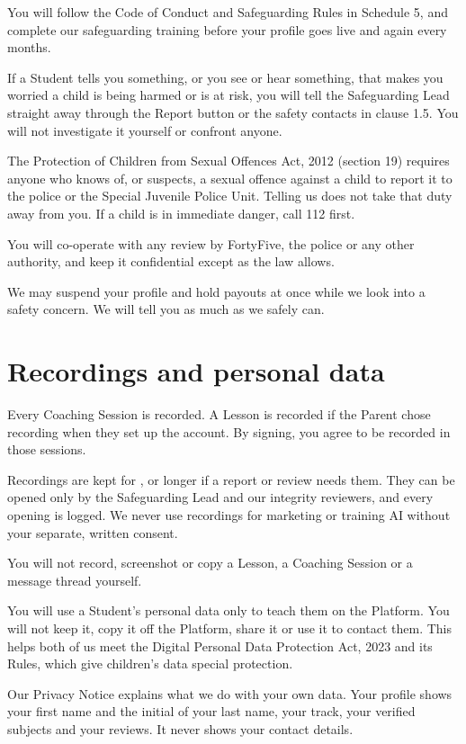 \documentclass[11pt]{article}
\begin{document}
\begin{clauses}
  \item You will follow the Code of Conduct and Safeguarding Rules in Schedule 5, and complete our safeguarding training before your profile goes live and again every  months.
  \item If a Student tells you something, or you see or hear something, that makes you worried a child is being harmed or is at risk, you will tell the Safeguarding Lead straight away through the Report button or the safety contacts in clause 1.5. You will not investigate it yourself or confront anyone.
  \item The Protection of Children from Sexual Offences Act, 2012 (section 19) requires anyone who knows of, or suspects, a sexual offence against a child to report it to the police or the Special Juvenile Police Unit. Telling us does not take that duty away from you. If a child is in immediate danger, call 112 first.
  \item You will co-operate with any review by FortyFive, the police or any other authority, and keep it confidential except as the law allows.
  \item We may suspend your profile and hold payouts at once while we look into a safety concern. We will tell you as much as we safely can.
\end{clauses}

\section{Recordings and personal data}

\begin{clauses}
  \item Every Coaching Session is recorded. A Lesson is recorded if the Parent chose recording when they set up the account. By signing, you agree to be recorded in those sessions.
  \item Recordings are kept for , or longer if a report or review needs them. They can be opened only by the Safeguarding Lead and our integrity reviewers, and every opening is logged. We never use recordings for marketing or training AI without your separate, written consent.
  \item You will not record, screenshot or copy a Lesson, a Coaching Session or a message thread yourself.
  \item You will use a Student's personal data only to teach them on the Platform. You will not keep it, copy it off the Platform, share it or use it to contact them. This helps both of us meet the Digital Personal Data Protection Act, 2023 and its Rules, which give children's data special protection.
  \item Our Privacy Notice explains what we do with your own data. Your profile shows your first name and the initial of your last name, your track, your verified subjects and your reviews. It never shows your contact details.
\end{clauses}
\end{document}

